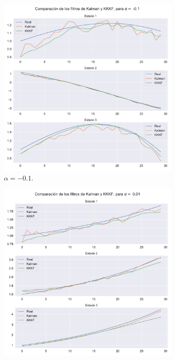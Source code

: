 \begin{figure}[h!]
    \centering
    \begin{subfigure}[b]{0.49\textwidth}
        \includegraphics[width=0.9\linewidth]{img/content/chapter4/kalman_vs_kerKKF_01.pdf}
    \caption{$\alpha = -0.1$.}
    \label{fig:kalman_vs_kerKKF_01}
    \end{subfigure}
    \begin{subfigure}[b]{0.49\textwidth}
        \includegraphics[width=0.9\linewidth]{img/content/chapter4/kalman_vs_kerKKF_001.pdf}

\end{subfigure}
\end{figure}
